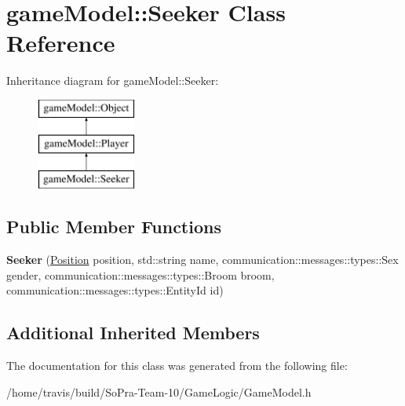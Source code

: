 \hypertarget{classgame_model_1_1_seeker}{\section{game\-Model\-:\-:Seeker Class Reference}
\label{classgame_model_1_1_seeker}
}
Inheritance diagram for game\-Model\-:\-:Seeker\-:\begin{figure}[H]
\begin{center}
\leavevmode
\includegraphics[height=3.000000cm]{classgame_model_1_1_seeker}
\end{center}
\end{figure}
\subsection*{Public Member Functions}
\begin{DoxyCompactItemize}
\item 
\hypertarget{classgame_model_1_1_seeker_aeb98e15de8e8c12a4131d9fb42790d6d}{{\bfseries Seeker} (\hyperlink{structgame_model_1_1_position}{Position} position, std\-::string name, communication\-::messages\-::types\-::\-Sex gender, communication\-::messages\-::types\-::\-Broom broom, communication\-::messages\-::types\-::\-Entity\-Id id)}\label{classgame_model_1_1_seeker_aeb98e15de8e8c12a4131d9fb42790d6d}

\end{DoxyCompactItemize}
\subsection*{Additional Inherited Members}


The documentation for this class was generated from the following file\-:\begin{DoxyCompactItemize}
\item 
/home/travis/build/\-So\-Pra-\/\-Team-\/10/\-Game\-Logic/Game\-Model.\-h\end{DoxyCompactItemize}

